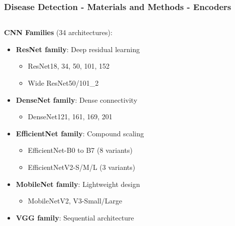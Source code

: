 \documentclass[aspectratio=43]{beamer}
\begin{document}
\begin{frame}
    \frametitle{\small Disease Detection - Materials and Methods - Encoders}
    \vspace{-0.3cm}
    \begin{columns}
        \begin{column}{0.5\textwidth}
            \tiny
            \begin{block}{\tiny \textbf{CNN Families} (34 architectures):}
                \begin{itemize}
                    \item \textbf{ResNet family}: Deep residual learning
                        \begin{itemize}
                            \tiny
                            \item ResNet18, 34, 50, 101, 152
                            \item Wide ResNet50/101\_2
                        \end{itemize}
                    \item \textbf{DenseNet family}: Dense connectivity
                        \begin{itemize}
                            \tiny
                            \item DenseNet121, 161, 169, 201
                        \end{itemize}
                    \item \textbf{EfficientNet family}: Compound scaling
                        \begin{itemize}
                            \tiny
                            \item EfficientNet-B0 to B7 (8 variants)
                            \item EfficientNetV2-S/M/L (3 variants)
                        \end{itemize}
                    \item \textbf{MobileNet family}: Lightweight design
                        \begin{itemize}
                            \tiny
                            \item MobileNetV2, V3-Small/Large
                        \end{itemize}
                    \item \textbf{VGG family}: Sequential architecture
                        \begin{itemize}
                            \tiny

\end{itemize}
\end{itemize}
\end{block}
\end{column}
\end{columns}
\end{frame}
\end{document}
